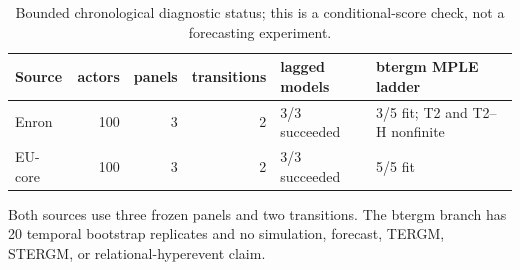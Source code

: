 \begin{table}[tbp]
\centering
\small
\caption{Bounded chronological diagnostic status; this is a conditional-score check, not a forecasting experiment.}
\label{tab:bounded-temporal}
\begin{tabular}{lrrrll}
\toprule
Source & actors & panels & transitions & lagged models & btergm MPLE ladder \\
\midrule
Enron & 100 & 3 & 2 & 3/3 succeeded & 3/5 fit; T2 and T2--H nonfinite \\
EU-core & 100 & 3 & 2 & 3/3 succeeded & 5/5 fit \\
\bottomrule
\end{tabular}
\par\vspace{2pt}\footnotesize Both sources use three frozen panels and two transitions. The btergm branch has 20 temporal bootstrap replicates and no simulation, forecast, TERGM, STERGM, or relational-hyperevent claim.
\end{table}
